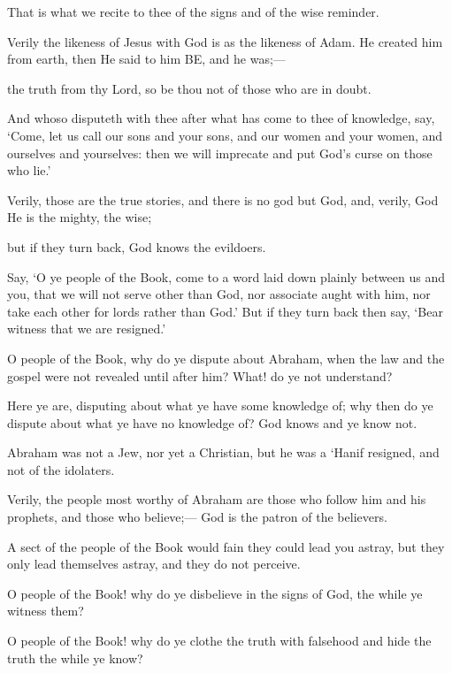 \documentclass[fontsize=14pt, letterpaper, notitlepage, openany, DIV=12]{scrbook} %
\begin{document}
\noindent[3:58]
That is what we recite to thee of the signs and of the wise reminder.

\noindent[3:59]
Verily the likeness of Jesus with God is as the likeness of Adam. He created him from
earth, then He said to him BE, and he was;---

\noindent[3:60]
the truth from thy Lord, so be thou not of those who are in doubt.

\noindent[3:61]
And whoso disputeth with thee after what has come to thee of knowledge, say, `Come, let
us call our sons and your sons, and our women and your women, and ourselves and yourselves:
then we will imprecate and put God's curse on those who lie.'

\noindent[3:62]
Verily, those are the true stories, and there is no god but God, and, verily, God He is the
mighty, the wise;

\noindent[3:63]
but if they turn back, God knows the evildoers.

\noindent[3:64]
Say, `O ye people of the Book, come to a word laid down plainly between us and you,
that we will not serve other than God, nor associate aught with him, nor take each other for lords
rather than God.' But if they turn back then say, `Bear witness that we are resigned.'

\noindent[3:65]
O people of the Book, why do ye dispute about Abraham, when the law and the gospel
were not revealed until after him? What! do ye not understand?

\noindent[3:66]
Here ye are, disputing about what ye have some knowledge of; why then do ye dispute
about what ye have no knowledge of? God knows and ye know not.

\noindent[3:67]
Abraham was not a Jew, nor yet a Christian, but he was a `Hanif resigned, and not of the
idolaters.

\noindent[3:68]
Verily, the people most worthy of Abraham are those who follow him and his prophets,
and those who believe;--- God is the patron of the believers.

\noindent[3:69]
A sect of the people of the Book would fain they could lead you astray, but they only lead
themselves astray, and they do not perceive.

\noindent[3:70]
O people of the Book! why do ye disbelieve in the signs of God, the while ye witness
them?

\noindent[3:71]
O people of the Book! why do ye clothe the truth with falsehood and hide the truth the
while ye know?
\end{document}
